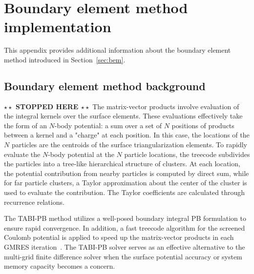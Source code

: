 \documentclass[12pt,titlepage]{article}
\newcommand{\todo}[1]{\textbf{$\star \star$ {#1} $\star \star$}}
\begin{document}
\section{Boundary element method implementation} \label{app:bem}
This appendix provides additional information about the boundary element method introduced in Section~\ref{sec:bem}.

\subsection{Boundary element method background}
\todo{STOPPED HERE}
The matrix-vector products involve evaluation of the integral kernels over the surface elements. These evaluations effectively take the form of an $N$-body potential: a sum over a set of $N$ positions of products between a kernel and a "charge" at each position. In this case, the locations of the $N$ particles are the centroids of the surface triangularization elements. To rapidly evaluate the $N$-body potential at the $N$ particle locations, the treecode subdivides the particles into a tree-like hierarchical structure of clusters. At each location, the potential contribution from nearby particles is computed by direct sum, while for far particle clusters, a Taylor approximation about the center of the cluster is used to evaluate the contribution. The Taylor coefficients are calculated through recurrence relations. 

The TABI-PB method utilizes a well-posed boundary integral PB formulation to ensure rapid convergence. In addition, a fast treecode algorithm for the screened Coulomb potential  is applied to speed up the matrix-vector products in each GMRES iteration~\cite{Juffer1991}. The TABI-PB solver serves as an effective alternative to the multi-grid finite difference solver when the surface potential accuracy or system memory capacity becomes a concern.
\end{document}
